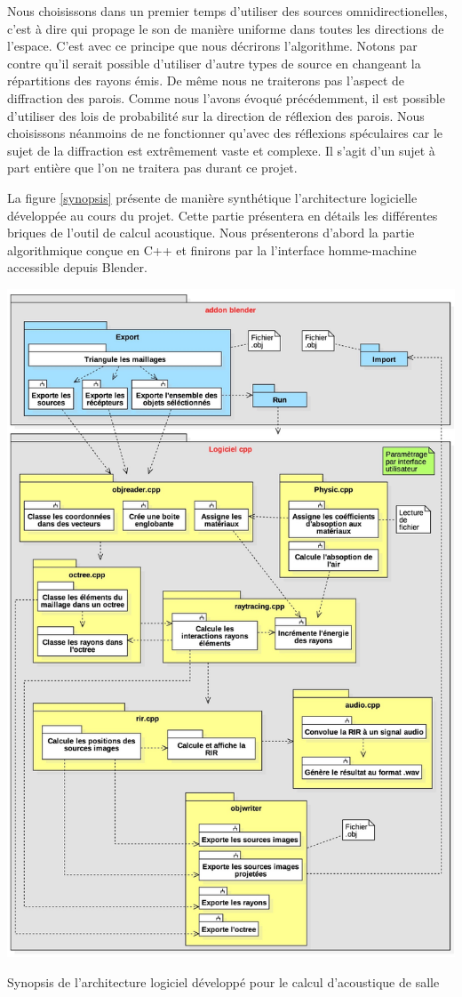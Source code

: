 Nous choisissons dans un premier temps d'utiliser des sources omnidirectionelles, c'est à dire qui propage le son de manière uniforme dans toutes les directions de l'espace. C'est avec ce principe que nous décrirons l'algorithme. Notons par contre qu'il serait possible d'utiliser d'autre types de source en changeant la répartitions des rayons émis. De même nous ne traiterons pas l'aspect de diffraction des parois. Comme nous l'avons évoqué précédemment, il est possible d'utiliser des lois de probabilité sur la direction de réflexion des parois. Nous choisissons néanmoins de ne fonctionner qu'avec des réflexions spéculaires car le sujet de la diffraction est extrêmement vaste et complexe. Il s'agit d'un sujet à part entière que l'on ne traitera pas durant ce projet.

La figure \ref{synopsis} présente de manière synthétique l'architecture logicielle développée au cours du projet. Cette partie présentera en détails les différentes briques de l'outil de calcul acoustique. Nous présenterons d'abord la partie algorithmique conçue en C++ et finirons par la l'interface homme-machine accessible depuis Blender.

\begin{figureth}
	\includegraphics[width=\linewidth]{images/synopsis}
	\caption{Synopsis de l'architecture logiciel développé pour le calcul d'acoustique de salle}
	\label{synopsis}
\end{figureth}


